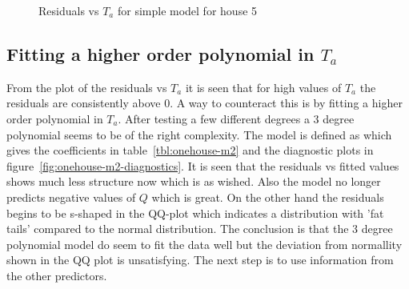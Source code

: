 \begin{figure}[ht]
    \centering
    \mbox{}
    \caption{Residuals vs $T_a$ for simple model for house 5}
    \label{fig:onehouse-m1-expla-res}
\end{figure}
\subsection*{Fitting a higher order polynomial in $T_a$}
From the plot of the residuals vs $T_a$ it is seen that for high values of $T_a$ the residuals are consistently above 0. A way to counteract this is by fitting a higher order polynomial in $T_a$. After testing a few different degrees a 3 degree polynomial seems to be of the right complexity. The model is defined as  which gives the coefficients in table~\ref{tbl:onehouse-m2} and the diagnostic plots in figure~\ref{fig:onehouse-m2-diagnostics}. It is seen that the residuals vs fitted values shows much less structure now which is as wished. Also the model no longer predicts negative values of $Q$ which is great. On the other hand the residuals begins to be s-shaped in the QQ-plot which indicates a distribution with 'fat tails' compared to the normal distribution. The conclusion is that the 3 degree polynomial model do seem to fit the data well but the deviation from normallity shown in the QQ plot is unsatisfying. The next step is to use information from the other predictors.

